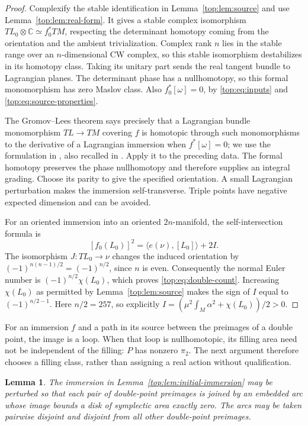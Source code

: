 \documentclass[11pt]{article}
\numberwithin{equation}{section}
\newtheorem{lemma}[theorem]{Lemma}
\theoremstyle{definition}
\theoremstyle{remark}
\begin{document}
\begin{proof}
Complexify the stable identification in
Lemma~\ref{top:lem:source} and use Lemma~\ref{top:lem:real-form}.  It
gives a stable complex isomorphism
$TL_0\otimes\mathbb C\simeq f_0^*TM$, respecting the determinant homotopy
coming from the orientation and the ambient trivialization.  Complex
rank $n$ lies in the stable range over an $n$-dimensional CW complex,
so this stable isomorphism destabilizes in its homotopy class.  Taking
its unitary part sends the real tangent bundle to Lagrangian planes.
The determinant phase has a nullhomotopy, so this formal monomorphism
has zero Maslov class.  Also $f_0^*[\omega]=0$, by
\eqref{top:eq:inputs} and \eqref{top:eq:source-properties}.

The Gromov--Lees theorem \cite{Top:Gromov,Top:Lees} says precisely that a Lagrangian bundle
monomorphism $TL\to TM$ covering $f$ is homotopic through such
monomorphisms to the derivative of a Lagrangian immersion when
$f^*[\omega]=0$; we use the formulation in
\cite[Theorem~16.3.2]{Top:EMbook}, also recalled in
\cite[Theorem~2.3]{Top:Rathel}.  Apply it to the preceding data.  The
formal homotopy preserves the phase nullhomotopy and therefore supplies
an integral grading.  Choose its parity to give the specified
orientation.  A small Lagrangian perturbation makes the immersion
self-transverse.  Triple points have negative expected dimension and
can be avoided.

For an oriented immersion into an oriented $2n$-manifold, the
self-intersection formula is
\[
 [f_0(L_0)]^2=\langle e(\nu),[L_0]\rangle+2I.
\]
The isomorphism $J:TL_0\to\nu$ changes the induced orientation by
$(-1)^{n(n-1)/2}=(-1)^{n/2}$, since $n$ is even.  Consequently the
normal Euler number is $(-1)^{n/2}\chi(L_0)$, which proves
\eqref{top:eq:double-count}.  Increasing $\chi(L_0)$ as permitted by
Lemma~\ref{top:lem:source} makes the sign of $I$ equal to
$(-1)^{n/2-1}$.
Here $n/2=257$, so explicitly
$I=(\mu^2\int_M\alpha^2+\chi(L_0))/2>0$.
\end{proof}

For an immersion $f$ and a path in its source between the preimages of
a double point, the image is a loop.  When that loop is nullhomotopic,
its filling area need not be independent of the filling: $P$ has
nonzero $\pi_2$.  The next argument therefore chooses a filling class,
rather than assigning a real action without qualification.

\begin{lemma}\label{top:lem:zero-actions}
The immersion in Lemma~\ref{top:lem:initial-immersion} may be perturbed
so that each pair of double-point preimages is joined by an embedded
arc whose image bounds a disk of symplectic area exactly zero.
The arcs may be taken pairwise disjoint and disjoint from all other
double-point preimages.
\end{lemma}
\end{document}
